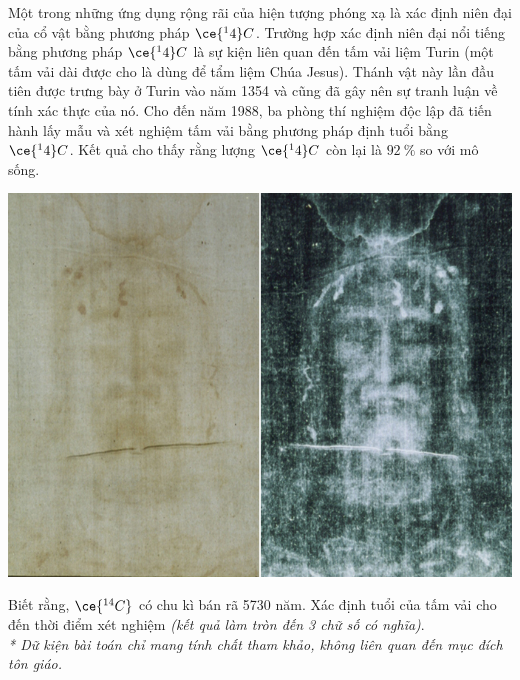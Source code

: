 \begin{ex}
	Một trong những ứng dụng rộng rãi của hiện tượng phóng xạ là xác định niên đại của cổ vật bằng phương pháp $\ce{^14}C$. Trường hợp xác định niên đại nổi tiếng bằng phương pháp $\ce{^14}C$  là sự kiện liên quan đến tấm vải liệm Turin (một tấm vải dài được cho là dùng để tẩm liệm Chúa Jesus). Thánh vật này lần đầu tiên được trưng bày ở Turin vào năm 1354 và cũng đã gây nên sự tranh luận về tính xác thực của nó. Cho đến năm 1988, ba phòng thí nghiệm độc lập đã tiến hành lấy mẫu và xét nghiệm tấm vải bằng phương pháp định tuổi bằng $\ce{^14}C$. Kết quả cho thấy rằng lượng $\ce{^14}C$ còn lại là $\SI{92}{\percent}$  so với mô sống.  
	\begin{center}
		\includegraphics[width=0.4\linewidth]{figs/VN12-Y24-PH-SYL-031P-3}
	\end{center}
	Biết rằng,   $\ce{^{14}C}$ có chu kì bán rã 5730 năm. Xác định tuổi của tấm vải cho đến thời điểm xét nghiệm \textit{(kết quả làm tròn đến 3 chữ số có nghĩa)}.\\
	\textit{* Dữ kiện bài toán chỉ mang tính chất tham khảo, không liên quan đến mục đích tôn giáo.}
\end{ex}
